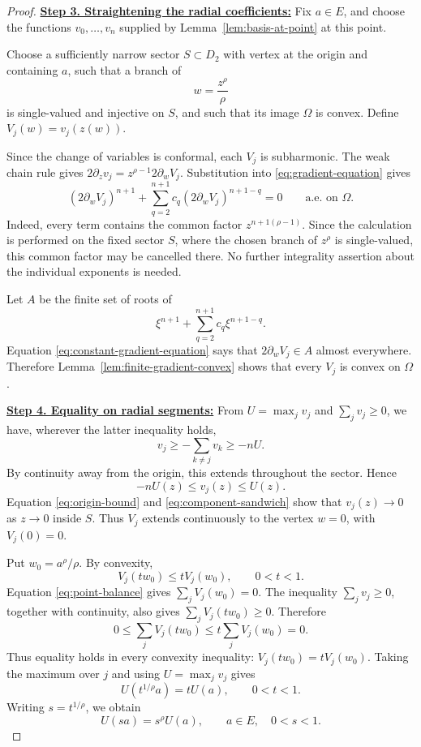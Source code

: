 \documentclass[12pt,letterpaper,reqno]{amsart}
\theoremstyle{definition}
\numberwithin{equation}{section}
\begin{document}
\begin{proof}
\medskip\noindent
\textbf{\underline{Step 3. Straightening the radial coefficients:}}
Fix \(a\in E\), and choose the functions
\(v_0,\ldots,v_{n}\) supplied by
Lemma~\ref{lem:basis-at-point} at this point.

Choose a sufficiently narrow sector \(S\subset D_2\) with vertex at
the origin and containing \(a\), such that a branch of
\[
w=\frac{z^\rho}{\rho}
\]
is single-valued and injective on \(S\), and such that its image
\(\Omega\) is convex. Define
\(V_j(w)=v_j(z(w))\).

Since the change of variables is conformal, each \(V_j\) is
subharmonic. The weak chain rule gives
\(2\partial_zv_j=z^{\rho-1}2\partial_wV_j\).
Substitution into \eqref{eq:gradient-equation} gives
\begin{equation}\label{eq:constant-gradient-equation}
 (2\partial_wV_j)^{n+1}
 +
 \sum_{q=2}^{n+1}
 c_q(2\partial_wV_j)^{{n+1}-q}
 =
 0
 \qquad\text{a.e.\ on }\Omega.
\end{equation}
Indeed, every term contains the common factor
\(z^{{n+1}(\rho-1)}\). Since the calculation is performed on the fixed
sector \(S\), where the chosen branch of \(z^\rho\) is single-valued,
this common factor may be cancelled there. No further integrality
assertion about the individual exponents is needed.

Let \(A\) be the finite set of roots of
\[
\xi^{n+1}+\sum_{q=2}^{n+1}c_q\xi^{{n+1}-q}.
\]
Equation \eqref{eq:constant-gradient-equation} says that
\(2\partial_wV_j\in A\) almost everywhere. Therefore
Lemma~\ref{lem:finite-gradient-convex} shows that every \(V_j\) is
convex on \(\Omega\).


\medskip\noindent
\textbf{\underline{Step 4. Equality on radial segments:}}
From \(U=\max_jv_j\) and
\(\sum_jv_j\geq0\), we have, wherever the latter inequality holds,
\[
v_j
\geq
-\sum_{k\ne j}v_k
\geq
-nU.
\]
By continuity away from the origin, this extends throughout the
sector. Hence
\begin{equation}\label{eq:component-sandwich}
 -nU(z)
 \leq
 v_j(z)
 \leq
 U(z).
\end{equation}
Equation \eqref{eq:origin-bound} and
\eqref{eq:component-sandwich} show that
\(v_j(z)\to0\) as \(z\to0\) inside \(S\). Thus \(V_j\) extends
continuously to the vertex \(w=0\), with \(V_j(0)=0\).

Put \(w_0=a^\rho/\rho\). By convexity,
\[
V_j(tw_0)
\leq
tV_j(w_0),
\qquad
0<t<1.
\]
Equation \eqref{eq:point-balance} gives
\(\sum_jV_j(w_0)=0\). The inequality
\(\sum_jv_j\geq0\), together with continuity, also gives
\(\sum_jV_j(tw_0)\geq0\). Therefore
\[
0
\leq
\sum_jV_j(tw_0)
\leq
t\sum_jV_j(w_0)
=
0.
\]
Thus equality holds in every convexity inequality:
\(V_j(tw_0)=tV_j(w_0)\). Taking the maximum over \(j\) and using
\(U=\max_jv_j\) gives
\[
U(t^{1/\rho}a)=tU(a),
\qquad
0<t<1.
\]
Writing \(s=t^{1/\rho}\), we obtain
\begin{equation}\label{eq:homogeneity-on-E}
 U(sa)=s^\rho U(a),
 \qquad
 a\in E,\quad 0<s<1.
\end{equation}


\end{proof}
\end{document}
